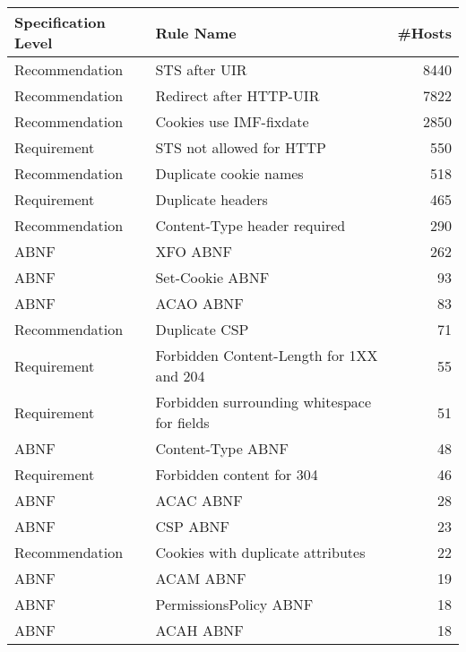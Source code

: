 \begin{tabular}{llr}
\toprule
Specification Level &                                   Rule Name &  \#Hosts \\
\midrule
     Recommendation &                       STS after UIR\rlap{*} &     8440 \\
     Recommendation &                     Redirect after HTTP-UIR &     7822 \\
     Recommendation &                     Cookies use IMF-fixdate &     2850 \\
        Requirement &                    STS not allowed for HTTP &      550 \\
     Recommendation &                      Duplicate cookie names &      518 \\
        Requirement &                           Duplicate headers &      465 \\
     Recommendation &                Content-Type header required &      290 \\
               ABNF &                                    XFO ABNF &      262 \\
               ABNF &                             Set-Cookie ABNF &       93 \\
               ABNF &                                   ACAO ABNF &       83 \\
     Recommendation &                               Duplicate CSP &       71 \\
        Requirement &    Forbidden Content-Length for 1XX and 204 &       55 \\
        Requirement & Forbidden surrounding whitespace for fields &       51 \\
               ABNF &                           Content-Type ABNF &       48 \\
        Requirement &                   Forbidden content for 304 &       46 \\
               ABNF &                                   ACAC ABNF &       28 \\
               ABNF &                                    CSP ABNF &       23 \\
     Recommendation &           Cookies with duplicate attributes &       22 \\
               ABNF &                                   ACAM ABNF &       19 \\
               ABNF &                      PermissionsPolicy ABNF &       18 \\
               ABNF &                                   ACAH ABNF &       18 \\

\end{tabular}
